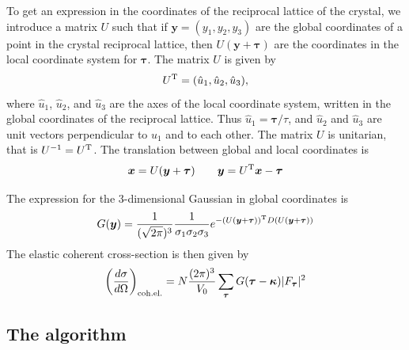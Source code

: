 To get an expression in the coordinates of the reciprocal lattice of the
crystal, we introduce a matrix $U$ such that if $\boldsymbol{y} =
(y_1,y_2,y_3)$ are the global coordinates of a point in the crystal
reciprocal lattice, then $U(\boldsymbol{y} + \boldsymbol{\tau})$ are the
coordinates in the local coordinate system for $\boldsymbol{\tau}$. The
matrix $U$ is given by
$$ U^{\rm T} = (\hat{u}_1, \hat{u}_2, \hat{u}_3), $$
where $\hat{u}_1$, $\hat{u}_2$, and $\hat{u}_3$ are the axes of the
local coordinate system, written in the global coordinates of the
reciprocal lattice. Thus
$\hat{u}_1 = \boldsymbol{\tau}/\tau$,  and $\hat{u}_2$ and $\hat{u}_3$ are
unit vectors perpendicular to $\hat{u}_1$ and to each other.
The matrix $U$ is unitarian, that is
$U^{-1} = U^{\rm T}$. The translation between global and local
coordinates is
$$ \boldsymbol{x} = U(\boldsymbol{y} + \boldsymbol{\tau}) \qquad
   \boldsymbol{y} = U^{\rm T} \boldsymbol{x} - \boldsymbol{\tau} $$

The expression for the 3-dimensional Gaussian in global coordinates is
\begin{equation}
  G(\boldsymbol{y}) =
  \frac{1}{(\sqrt{2\pi})^3}\frac{1}{\sigma_1\sigma_2\sigma_3}
  e^{-(U(\boldsymbol{y}+\boldsymbol{\tau}))^{\rm T} D (U(\boldsymbol{y}+\boldsymbol{\tau}))}
\end{equation}
The elastic coherent cross-section is then given by
\begin{equation}
  \label{eq:crystal-cross-section}
  \left(\frac{d\sigma}{d\Omega}\right)_{\rm coh.el.} =
        N\frac{(2\pi)^3}{V_0}\sum_{\boldsymbol{\tau}}
        G(\boldsymbol{\tau} - \boldsymbol{\kappa})
         |F_{\boldsymbol{\tau}}|^2
\end{equation}

\subsection{The algorithm}

